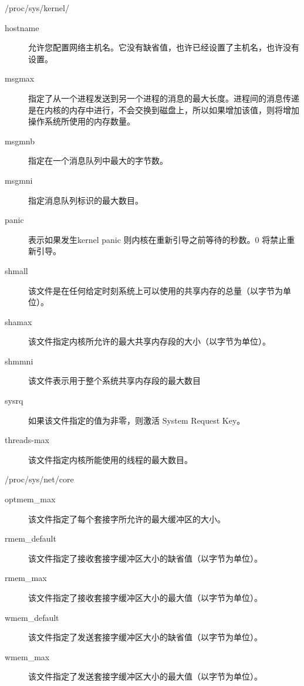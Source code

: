 \begin{frame}{/proc/sys/kernel/}
\begin{description}
\item[hostname] 允许您配置网络主机名。它没有缺省值，也许已经设置了主机名，也许没有设置。
\item[msgmax] 指定了从一个进程发送到另一个进程的消息的最大长度。进程间的消息传递是在内核的内存中进行，不会交换到磁盘上，所以如果增加该值，则将增加操作系统所使用的内存数量。
\item[msgmnb] 指定在一个消息队列中最大的字节数。
\item[msgmni] 指定消息队列标识的最大数目。
\item[panic] 表示如果发生kernel panic 则内核在重新引导之前等待的秒数。0 将禁止重新引导。
\item[shmall] 该文件是在任何给定时刻系统上可以使用的共享内存的总量（以字节为单位）。
\item[shamax] 该文件指定内核所允许的最大共享内存段的大小（以字节为单位）。
\item[shmmni] 该文件表示用于整个系统共享内存段的最大数目
\item[sysrq] 如果该文件指定的值为非零，则激活 System Request Key。
\item[threads-max]  该文件指定内核所能使用的线程的最大数目。
\end{description}
\end{frame}


\begin{frame}{/proc/sys/net/core}
\begin{description}
\item[optmem\_max] 该文件指定了每个套接字所允许的最大缓冲区的大小。

\item[rmem\_default] 该文件指定了接收套接字缓冲区大小的缺省值（以字节为单位）。

\item[rmem\_max] 该文件指定了接收套接字缓冲区大小的最大值（以字节为单位）。

\item[wmem\_default] 该文件指定了发送套接字缓冲区大小的缺省值（以字节为单位）。

\item[wmem\_max] 该文件指定了发送套接字缓冲区大小的最大值（以字节为单位）。
\end{description}
\end{frame}

